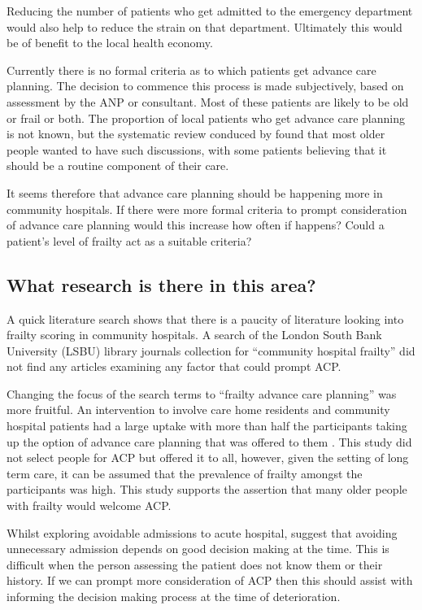 \documentclass
[
	12pt,
	a4paper,
	oneside,
]{report}
\begin{document}
Reducing the number of patients who get admitted to the emergency department would
also help to reduce the strain on that department. Ultimately this would be of
benefit to the local health economy.

Currently there is no formal criteria as to which patients get advance care 
planning.
The decision to commence this process is made subjectively, based on assessment 
by the ANP or consultant. Most of these patients are likely to be old or frail
or both. The proportion of local patients who get advance care planning is not known,
but the systematic review conduced by \textcite{sharp:13} found that most older
people wanted to have such discussions, with some patients believing that it 
should be a routine component of their care.

It seems therefore that advance care planning should be happening more in community
hospitals. If there were more formal criteria to prompt consideration
of advance care planning would this increase how often if happens? Could 
a patient's level of frailty act as a suitable criteria?

\subsection{What research is there in this area?}

A quick literature search shows that there is a paucity of literature looking 
into frailty scoring in community hospitals.
A search of the London South Bank University (LSBU) library journals 
collection for ``community hospital frailty''
did not find any articles examining any factor that could prompt ACP.

Changing the focus of the search terms to ``frailty advance care planning''
was more fruitful.
An intervention to involve care home residents and community hospital patients
had a large uptake with more than half the participants taking up the option of
advance care planning that was offered to them \parencite{mcglade:17}. This 
study did not select people for ACP but offered it to all, however, given the 
setting of long term care, it can be assumed that the prevalence of frailty
amongst the participants was high. This study supports the assertion that many
older people with frailty would welcome ACP.

Whilst exploring avoidable admissions to acute hospital, \textcite{mytton:12} 
suggest that avoiding unnecessary admission depends on good decision making at 
the time. This is difficult when the person assessing the patient does not know
them or their history. If we can prompt more consideration of ACP then this 
should assist with informing the decision making process at the time of 
deterioration.
\end{document}
